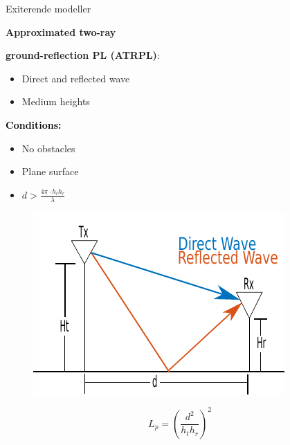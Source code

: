 \begin{frame}{Exiterende modeller}
\begin{minipage}{.45\textwidth}
\raggedright\textcolor{thomasred}{\textbf{Approximated two-ray}}\\
\raggedright\textcolor{thomasred}{\textbf{ground-reflection PL (ATRPL)}:}
\begin{itemize}
\item Direct and reflected wave
\item Medium heights
\end{itemize} 

\vspace{1em}
\textcolor{black}{\textbf{Conditions:}}
\begin{itemize}
\item No obstacles
\item Plane surface
\item $d > \frac{4\pi \cdot h_t h_r }{\lambda}$
\end{itemize}

\end{minipage}
\begin{minipage}{0.5\textwidth}
\begin{figure}[!htbp]
 \centering
  \includegraphics[width = \columnwidth]{figures/two_ray_illu.pdf}
  \end{figure}
\end{minipage}

\vspace{1em}
\begin{equation*}
L_{p} = \left(\frac{d^2}{h_t h_r}\right)^2
\label{two_ray_model}
\end{equation*}
\end{frame}



